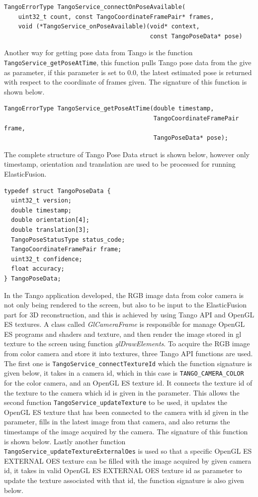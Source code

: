 \documentclass[12pt,twoside]{article}
\begin{document}
\begin{lstlisting}
TangoErrorType TangoService_connectOnPoseAvailable(
    uint32_t count, const TangoCoordinateFramePair* frames,
    void (*TangoService_onPoseAvailable)(void* context,
                                         const TangoPoseData* pose)
\end{lstlisting}
Another way for getting pose data from Tango is the function \\
\verb|TangoService_getPoseAtTime|, this function pulls Tango pose data from the give as parameter, if this parameter is set to 0.0, the latest estimated pose is returned with respect to the coordinate of frames given. The signature of this function is shown below.\\
\begin{lstlisting}
TangoErrorType TangoService_getPoseAtTime(double timestamp,
                                          TangoCoordinateFramePair frame,
                                          TangoPoseData* pose);
\end{lstlisting}
The complete structure of Tango Pose Data struct is shown below, however only timestamp, orientation and translation are used to be processed for running ElasticFusion. \\
\begin{lstlisting}
typedef struct TangoPoseData {
  uint32_t version;
  double timestamp;
  double orientation[4];
  double translation[3];
  TangoPoseStatusType status_code;
  TangoCoordinateFramePair frame;
  uint32_t confidence;
  float accuracy;
} TangoPoseData;
\end{lstlisting}
In the Tango application developed, the RGB image data from color camera is not only being rendered to the screen, but also to be input to the ElasticFusion part for 3D reconstruction, and this is achieved by using Tango API and OpenGL ES textures. A class called \textit{GlCameraFrame} is responsible for manage OpenGL ES programs and shaders and texture, and then render the image stored in gl texture to the screen using function \textit{glDrawElements}. To acquire the RGB image from color camera and store it into textures, three Tango API functions are used. The first one is \verb|TangoService_connectTextureId| which the function signature is given below, it takes in a camera id, which in this case is \verb|TANGO_CAMERA_COLOR| for the color camera, and an OpenGL ES texture id. It connects the texture id of the texture to the camera which id is given in the parameter. This allows the second function \verb|TangoService_updateTexture| to be used, it updates the OpenGL ES texture that has been connected to the camera with id given in the parameter, fills in the latest image from that camera, and also returns the timestamps of the image acquired by the camera. The signature of this function is shown below. Lastly another function \verb|TangoService_updateTextureExternalOes| is used so that a specific OpenGL ES EXTERNAL OES texture can be filled with the image acquired by given camera id, it takes in valid OpenGL ES EXTERNAL OES texture id as parameter to update the texture associated with that id, the function signature is also given below.\\
\end{document}
